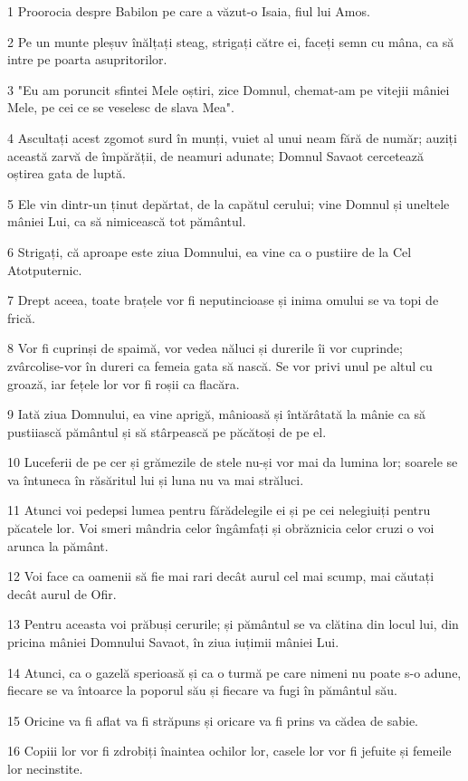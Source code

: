 \par 1 Proorocia despre Babilon pe care a văzut-o Isaia, fiul lui Amos.
\par 2 Pe un munte pleșuv înălțați steag, strigați către ei, faceți semn cu mâna, ca să intre pe poarta asupritorilor.
\par 3 "Eu am poruncit sfintei Mele oștiri, zice Domnul, chemat-am pe vitejii mâniei Mele, pe cei ce se veselesc de slava Mea".
\par 4 Ascultați acest zgomot surd în munți, vuiet al unui neam fără de număr; auziți această zarvă de împărății, de neamuri adunate; Domnul Savaot cercetează oștirea gata de luptă.
\par 5 Ele vin dintr-un ținut depărtat, de la capătul cerului; vine Domnul și uneltele mâniei Lui, ca să nimicească tot pământul.
\par 6 Strigați, că aproape este ziua Domnului, ea vine ca o pustiire de la Cel Atotputernic.
\par 7 Drept aceea, toate brațele vor fi neputincioase și inima omului se va topi de frică.
\par 8 Vor fi cuprinși de spaimă, vor vedea năluci și durerile îi vor cuprinde; zvârcolise-vor în dureri ca femeia gata să nască. Se vor privi unul pe altul cu groază, iar fețele lor vor fi roșii ca flacăra.
\par 9 Iată ziua Domnului, ea vine aprigă, mânioasă și întărâtată la mânie ca să pustiiască pământul și să stârpească pe păcătoși de pe el.
\par 10 Luceferii de pe cer și grămezile de stele nu-și vor mai da lumina lor; soarele se va întuneca în răsăritul lui și luna nu va mai străluci.
\par 11 Atunci voi pedepsi lumea pentru fărădelegile ei și pe cei nelegiuiți pentru păcatele lor. Voi smeri mândria celor îngâmfați și obrăznicia celor cruzi o voi arunca la pământ.
\par 12 Voi face ca oamenii să fie mai rari decât aurul cel mai scump, mai căutați decât aurul de Ofir.
\par 13 Pentru aceasta voi prăbuși cerurile; și pământul se va clătina din locul lui, din pricina mâniei Domnului Savaot, în ziua iuțimii mâniei Lui.
\par 14 Atunci, ca o gazelă sperioasă și ca o turmă pe care nimeni nu poate s-o adune, fiecare se va întoarce la poporul său și fiecare va fugi în pământul său.
\par 15 Oricine va fi aflat va fi străpuns și oricare va fi prins va cădea de sabie.
\par 16 Copiii lor vor fi zdrobiți înaintea ochilor lor, casele lor vor fi jefuite și femeile lor necinstite.
